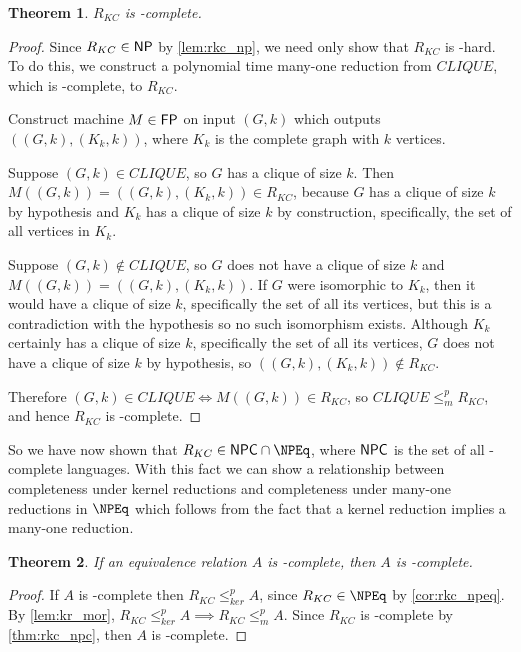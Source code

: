 \documentclass[draft]{article}
\newtheorem{theorem}{Theorem}%
\theoremstyle{definition}
\newcommand{\kr}{\leq^{p}_{ker}} %
\newcommand{\mor}{\leq^{p}_{m}} %
\begin{document}
\begin{theorem}\label{thm:rkc_npc}$R_{KC}$ is \NP-complete.\end{theorem}
\begin{proof}
  Since $R_{KC}\in{\ensuremath{\mathsf{NP}}}$ by \autoref{lem:rkc_np}, we need only show that $R_{KC}$
  is \NP-hard. To do this, we construct a polynomial time many-one reduction
  from $CLIQUE$, which is \NP-complete, to $R_{KC}$.

  Construct machine $M\in{\ensuremath{\mathsf{FP}}}$ on input $(G, k)$ which outputs $((G, k), (K_k,
  k))$, where $K_k$ is the complete graph with $k$ vertices.

  Suppose $(G,k)\in CLIQUE$, so $G$ has a clique of size $k$. Then
  $M((G,k))=((G,k), (K_k, k))\in R_{KC}$, because $G$ has a clique of size
  $k$ by hypothesis and $K_k$ has a clique of size $k$ by construction,
  specifically, the set of all vertices in $K_k$.
  
  Suppose $(G,k)\notin CLIQUE$, so $G$ does not have a clique of size $k$ and
  $M((G,k))=((G,k), (K_k, k))$. If $G$ were isomorphic to $K_k$, then it would
  have a clique of size $k$, specifically the set of all its vertices, but this
  is a contradiction with the hypothesis so no such isomorphism
  exists. Although $K_k$ certainly has a clique of size $k$, specifically the
  set of all its vertices, $G$ does not have a clique of size $k$ by
  hypothesis, so $((G, k), (K_k, k))\notin R_{KC}$.
  
  Therefore $(G,k)\in CLIQUE\iff M((G,k))\in R_{KC}$, so $CLIQUE\mor R_{KC}$,
  and hence $R_{KC}$ is \NP-complete.
\end{proof}

So we have now shown that $R_{KC}\in\NPC\cap\NPEq$, where ${\mathsf{NPC}}$ is the set of
all \NP-complete languages. With this fact we can show a relationship between
completeness under kernel reductions and completeness under many-one reductions
in $\NPEq$ which follows from the fact that a kernel reduction implies a
many-one reduction.

\begin{theorem}\label{thm:npeqc_npc}If an equivalence relation $A$ is
  \NPEq-complete, then $A$ is \NP-complete.\end{theorem}
\begin{proof}
  If $A$ is \NPEq-complete then $R_{KC}\kr A$, since $R_{KC}\in\NPEq$ by
  \autoref{cor:rkc_npeq}. By \autoref{lem:kr_mor}, $R_{KC}\kr A\implies
  R_{KC}\mor A$. Since $R_{KC}$ is \NP-complete by \autoref{thm:rkc_npc}, then
  $A$ is \NP-complete.
\end{proof}
\end{document}

